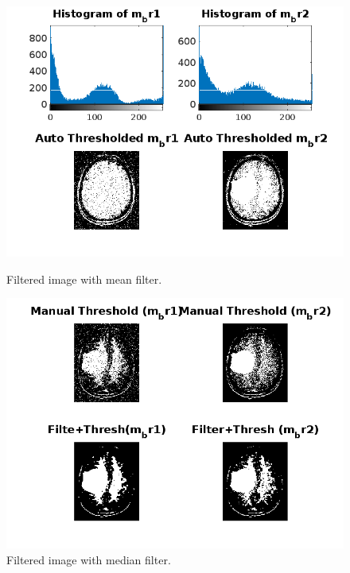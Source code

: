 \documentclass[11pt,letterpaper,twocolumn]{article}
\begin{document}
\begin{figure}[H]
    \centering
    \begin{minipage}{0.45\textwidth}
        \centering
        \includegraphics[width=\textwidth]{results/Figure 3.png}
        \caption{Filtered image with mean filter.}
        \label{fig:manual}
    \end{minipage}\hfill
    \begin{minipage}{0.45\textwidth}
        \centering
        \includegraphics[width=\textwidth]{results/Figure 4.png}
        \caption{Filtered image with median filter.}
        \label{fig:auto}
    \end{minipage}
\end{figure}
\end{document}
